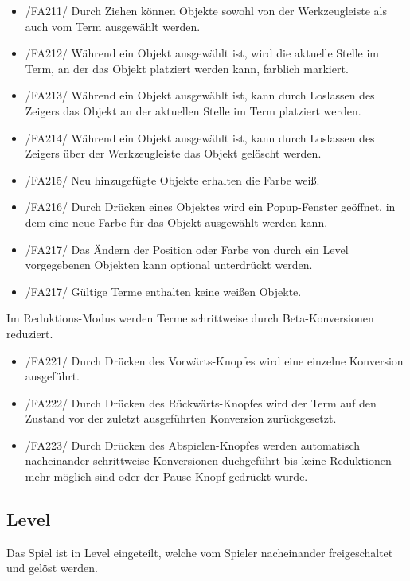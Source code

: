 \begin{itemize}
\item /FA211/ Durch Ziehen können Objekte sowohl von der Werkzeugleiste als auch vom Term ausgewählt werden.
\item /FA212/ Während ein Objekt ausgewählt ist, wird die aktuelle Stelle im Term, an der das Objekt platziert werden kann, farblich markiert.
\item /FA213/ Während ein Objekt ausgewählt ist, kann durch Loslassen des Zeigers das Objekt an der aktuellen Stelle im Term platziert werden.
\item /FA214/ Während ein Objekt ausgewählt ist, kann durch Loslassen des Zeigers über der Werkzeugleiste das Objekt gelöscht werden.
\item /FA215/ Neu hinzugefügte Objekte erhalten die Farbe weiß.
\item /FA216/ Durch Drücken eines Objektes wird ein Popup-Fenster geöffnet, in dem eine neue Farbe für das Objekt ausgewählt werden kann.
\item /FA217/ Das Ändern der Position oder Farbe von durch ein Level vorgegebenen Objekten kann optional unterdrückt werden.
\item /FA217/ Gültige Terme enthalten keine weißen Objekte.
\end{itemize}

Im Reduktions-Modus werden Terme schrittweise durch Beta-Konversionen reduziert.

\begin{itemize}
\item /FA221/ Durch Drücken des Vorwärts-Knopfes wird eine einzelne Konversion ausgeführt.
\item /FA222/ Durch Drücken des Rückwärts-Knopfes wird der Term auf den Zustand vor der zuletzt ausgeführten Konversion zurückgesetzt.
\item /FA223/ Durch Drücken des Abspielen-Knopfes werden automatisch nacheinander schrittweise Konversionen duchgeführt bis keine Reduktionen mehr möglich sind oder der Pause-Knopf gedrückt wurde.
\end{itemize}

\subsection{Level}

Das Spiel ist in Level eingeteilt, welche vom Spieler nacheinander freigeschaltet und gelöst werden.

